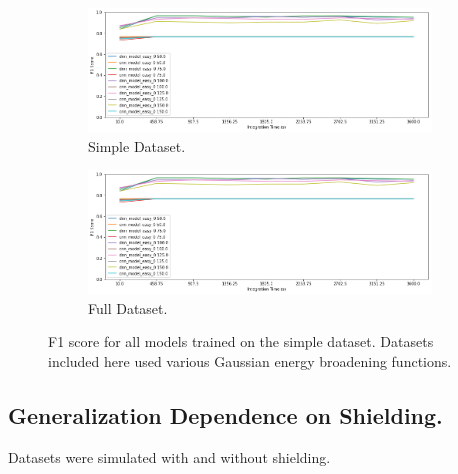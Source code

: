 \begin{figure}[H]
     \centering
     \begin{subfigure}[b]{0.9\textwidth}
         \centering
         \includegraphics[width=\textwidth]{images/results_easy_distance_comparison}
         \caption{Simple Dataset.}
         \label{fig:results_easy_distance_comparison_simple}
     \end{subfigure}

     \begin{subfigure}[b]{0.9\textwidth}
         \centering
         \includegraphics[width=\textwidth]{images/results_easy_distance_comparison}
         \caption{Full Dataset.}
         \label{fig:results_easy_distance_comparison_full}
     \end{subfigure}
        \caption{F1 score for all models trained on the simple dataset. Datasets included here used various Gaussian energy broadening functions.}
        \label{fig:results_easy_distance_comparison}
\end{figure}


\subsection{Generalization Dependence on Shielding.}

Datasets were simulated with and without shielding. 

